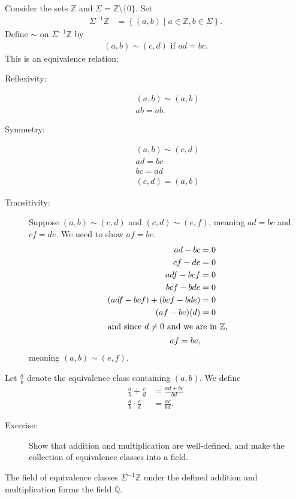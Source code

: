 \documentclass[10pt]{extarticle}
\newcommand{\Q}{\mathbb{Q}}
\newcommand{\Z}{\mathbb{Z}}
\begin{document}
  Consider the sets $\Z$ and $\Sigma = \Z\setminus \{0\}$. Set
  \begin{align*}
   \Sigma^{-1}\Z &= \left\{(a,b)\mid a\in\Z,b\in\Sigma\right\}.
  \end{align*}
  Define $\sim$ on $\Sigma^{-1}\Z$ by
  \begin{align*}
   (a,b)\sim (c,d) \text{ if } ad = bc.
  \end{align*}
  This is an equivalence relation:
  \begin{description}
   \item[Reflexivity:] 
     \begin{align*}
       (a,b)\sim (a,b)\\
       ab = ab.
     \end{align*}
   \item[Symmetry:] 
     \begin{align*}
       (a,b)\sim (c,d)\\
       ad = bc\\
       bc = ad\\
       (c,d) = (a,b)
     \end{align*}
   \item[Transitivity:] Suppose $(a,b)\sim (c,d)$ and $(c,d)\sim (e,f)$, meaning $ad = bc$ and $cf = de$. We need to show $af = be$.
     \begin{align*}
       ad - bc &= 0\\
       cf - de &= 0\\
       adf - bcf &= 0\\
       bcf - bde &= 0\\
       (adf - bcf) + (bcf - bde) &= 0\\
       (af-be)(d) &= 0\\
       \intertext{and since $d\neq 0$ and we are in $\Z$,}
       af = be,
     \end{align*}
     meaning $(a,b)\sim (e,f)$.
  \end{description}
  Let $\frac{a}{b}$ denote the equivalence class containing $(a,b)$. We define
  \begin{align*}
   \frac{a}{b} + \frac{c}{d} &= \frac{ad + bc}{bd}\\
   \frac{a}{b}\cdot \frac{c}{d} &= \frac{ac}{bd}.
  \end{align*}
  \begin{description}
   \item[Exercise:] Show that addition and multiplication are well-defined, and make the collection of equivalence classes into a field.
  \end{description}
  The field of equivalence classes $\Sigma^{-1}\Z$ under the defined addition and multiplication forms the field $\Q$.\\
\end{document}
